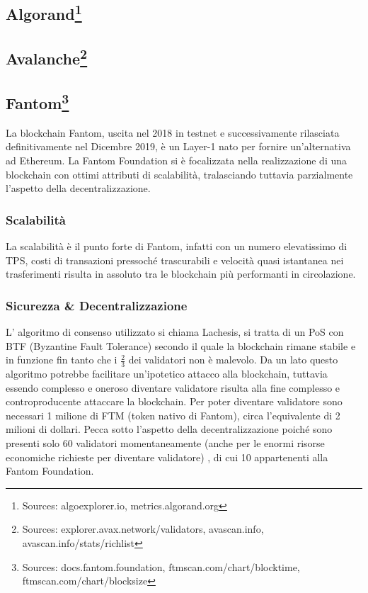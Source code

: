 \documentclass[a4paper, 12pt]{article}
\begin{document}
\subsection*{Algorand\footnote{Sources: algoexplorer.io, metrics.algorand.org}}
\newpage
\subsection*{Avalanche\footnote{Sources: explorer.avax.network/validators, avascan.info, avascan.info/stats/richlist}}
\newpage
\subsection*{Fantom\footnote{Sources: docs.fantom.foundation, ftmscan.com/chart/blocktime, ftmscan.com/chart/blocksize}}
La blockchain Fantom, uscita nel 2018 in testnet e successivamente rilasciata definitivamente nel Dicembre 2019, è un Layer-1 nato per fornire un'alternativa ad Ethereum.
La Fantom Foundation si è focalizzata nella realizzazione di una blockchain con ottimi attributi di scalabilità, tralasciando tuttavia parzialmente l'aspetto della decentralizzazione.
\subsubsection*{Scalabilità}
La scalabilità è il punto forte di Fantom, infatti con un numero elevatissimo di TPS, costi di transazioni pressoché trascurabili e velocità quasi istantanea nei trasferimenti risulta in assoluto tra le blockchain più performanti in circolazione.
\subsubsection*{Sicurezza \& Decentralizzazione}
L' algoritmo di consenso utilizzato si chiama Lachesis, si tratta di un PoS con BTF (Byzantine Fault Tolerance) secondo il quale la blockchain rimane stabile e in funzione fin tanto che i $\frac{2}{3}$ dei validatori non è malevolo.
Da un lato questo algoritmo potrebbe facilitare un'ipotetico attacco alla blockchain, tuttavia essendo complesso e oneroso diventare validatore risulta alla fine complesso e controproducente attaccare la blockchain.
Per poter diventare validatore sono necessari 1 milione di FTM (token nativo di Fantom), circa l’equivalente di 2 milioni di dollari.
Pecca sotto l’aspetto della decentralizzazione poiché sono presenti solo 60 validatori momentaneamente (anche per le enormi risorse economiche richieste per diventare validatore) , di cui 10 appartenenti alla Fantom Foundation.
\end{document}
